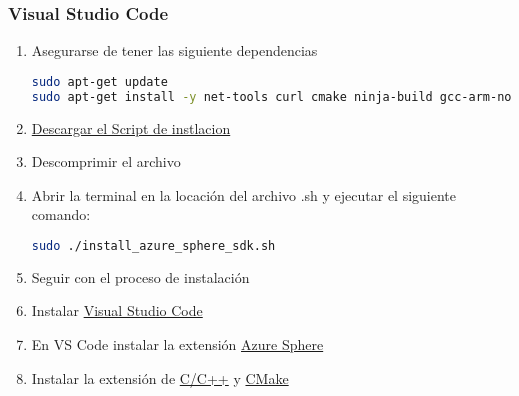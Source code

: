 \subsubsection*{Visual Studio Code}
\begin{enumerate}
	\item 
	Asegurarse de tener las siguiente dependencias
	\begin{lstlisting}[language=bash]
sudo apt-get update
sudo apt-get install -y net-tools curl cmake ninja-build gcc-arm-none-eabi
	\end{lstlisting}
	\item 
	\href{https://aka.ms/AzureSphereSDKInstall/Linux}{Descargar el Script de instlacion}
	\item 
	Descomprimir el archivo
	\item
	Abrir la terminal en la locación del archivo .sh y ejecutar el siguiente comando:
	\begin{lstlisting}[language=bash]
sudo ./install_azure_sphere_sdk.sh
	\end{lstlisting}
	\item 
	Seguir con el proceso de instalación
	\item 
	Instalar \href{https://code.visualstudio.com/download}{Visual Studio Code}
	\item 
	En VS Code instalar la extensión \href{https://marketplace.visualstudio.com/items?itemName=ms-vscode.azure-sphere-tools}{Azure Sphere}
	\item Instalar la extensión de \href{https://marketplace.visualstudio.com/items?itemName=ms-vscode.cpptools}{C/C++} y \href{https://marketplace.visualstudio.com/items?itemName=ms-vscode.cmake-tools}{CMake}
\end{enumerate}